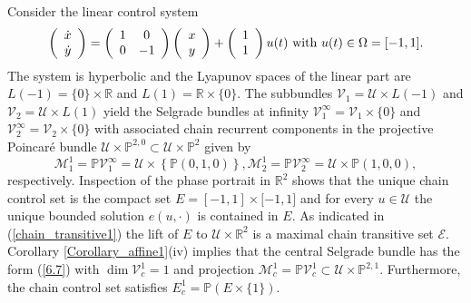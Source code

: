 	\begin{example}
		\label{Example_hyp1}Consider the linear control system
		\begin{equation}
			\left(
			\begin{array}
				[c]{c}%
				\dot{x}\\
				\dot{y}%
			\end{array}
			\right)  =\left(
			\begin{array}
				[c]{cc}%
				1 & 0\\
				0 & -1
			\end{array}
			\right)  \left(
			\begin{array}
				[c]{c}%
				x\\
				y
			\end{array}
			\right)  +\left(
			\begin{array}
				[c]{c}%
				1\\
				1
			\end{array}
			\right)  u(t)\mbox{ with }u(t)\in\Omega=[-1,1]. \label{Ex6.2b}%
		\end{equation}
		The system is hyperbolic and the Lyapunov spaces of the linear part are
		$L(-1)=\{0\}\times\mathbb{R}$ and $L(1)=\mathbb{R}\times\{0\}$. The subbundles
		$\mathcal{V}_{1}=\mathcal{U}\times L(-1)$ and $\mathcal{V}_{2}=\mathcal{U}%
		\times L(1)$ yield the Selgrade bundles at infinity $\mathcal{V}_{1}^{\infty
		}=\mathcal{V}_{1}\times\{0\}$ and $\mathcal{V}_{2}^{\infty}=\mathcal{V}%
		_{2}\times\{0\}$ with associated chain recurrent components in the projective
		Poincar\'{e} bundle $\mathcal{U}\times\mathbb{P}^{2,0}\subset\mathcal{U}%
		\times\mathbb{P}^{2}$ given by%
		\[
		\mathcal{M}_{1}^{1}=\mathbb{P}\mathcal{V}_{1}^{\infty}=\mathcal{U}%
		\times\left\{  \mathbb{P}(0,1,0)\right\}  ,\mathcal{M}_{2}^{1}=\mathbb{P}%
		\mathcal{V}_{2}^{\infty}=\mathcal{U}\times\mathbb{P}(1,0,0),
		\]
		respectively. Inspection of the phase portrait in $\mathbb{R}^{2}$ shows that
		the unique chain control set is the compact set $E=\left[  -1,1\right]
		\times\lbrack-1,1]$ and for every $u\in\mathcal{U}$ the unique bounded
		solution $e(u,\cdot)$ is contained in $E$. As indicated in
		(\ref{chain_transitive1}) the lift of $E$ to $\mathcal{U}\times\mathbb{R}^{2}$
		is a maximal chain transitive set $\mathcal{E}$. Corollary
		\ref{Corollary_affine1}(iv) implies that the central Selgrade bundle has the
		form (\ref{6.7}) with $\dim\mathcal{V}_{c}^{1}=1$ and projection
		$\mathcal{M}_{c}^{1}=\mathbb{P}\mathcal{V}_{c}^{1}\subset\mathcal{U}%
		\times\mathbb{P}^{2,1}$. Furthermore, the chain control set satisfies
		$E_{c}^{1}=\mathbb{P}\left(  E\times\{1\}\right)  $.
	\end{example}
	
